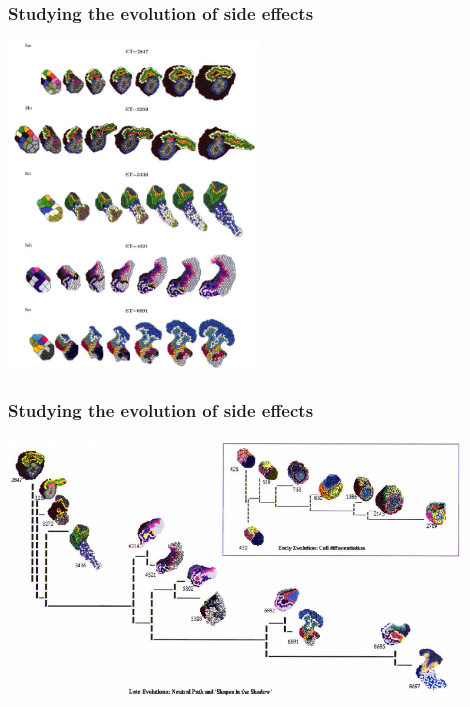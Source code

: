 \documentclass[compress]{beamer}
\begin{document}
\begin{frame}
\frametitle{Studying the evolution of side effects}   
\begin{center}
     \includegraphics[width=0.5\textwidth]{figures/hogeweg_dev.png}\\
    \end{center}
\end{frame}


\begin{frame}
\frametitle{Studying the evolution of side effects}   
\begin{center}
     \includegraphics[width=0.9\textwidth]{figures/hogeweg_shadow.png}\\
    \end{center}
\end{frame}
\end{document}
